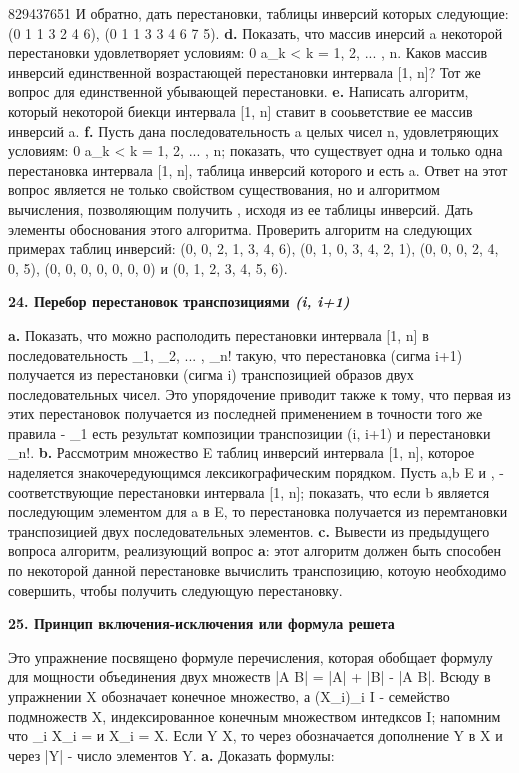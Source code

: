 ﻿
829437651\rgroup 
И обратно, дать перестановки, таблицы инверсий которых следующие:
(0 1 1 3 2 4 6), (0 1 1 3 3 4 6 7 5).
\textbf{d.} Показать, что массив инерсий a некоторой перестановки \sigma  удовлетворяет условиям: 0 \leqslant a_{k} <  k = 1, 2, ... , n. Каков массив инверсий единственной возрастающей перестановки интервала [1, n]? Тот же вопрос для единственной убывающей перестановки.
\textbf{e.} Написать алгоритм, который некоторой биекци \alpha интервала [1, n] ставит в сооьветствие ее массив инверсий a.
\textbf{f.} Пусть дана последовательность a целых чисел n, удовлетряющих условиям: 0 \leqslant a_{k} <  k = 1, 2, ... , n; показать, что существует одна и только одна перестановка \sigma интервала [1, n], таблица инверсий которого и есть a. Ответ на этот вопрос является не только свойством существования, но и алгоритмом вычисления, позволяющим получить \alpha, исходя из ее таблицы инверсий. Дать элементы обоснования этого алгоритма.
Проверить алгоритм на следующих примерах таблиц инверсий:
(0, 0, 2, 1, 3, 4, 6), (0, 1, 0, 3, 4, 2, 1), (0, 0, 0, 2, 4, 0, 5),
(0, 0, 0, 0, 0, 0, 0) и (0, 1, 2, 3, 4, 5, 6).

\textbf{24. Перебор перестановок транспозициями \textit{(i, i+1)}}

\textbf{a.} Показать, что можно располодить перестановки интервала [1, n] в последовательность \sigma_{1}, \sigma_{2}, ... , \sigma_{n!} такую, что перестановка (сигма i+1) получается из перестановки (сигма i) транспозицией образов двух последовательных чисел. Это упорядочение приводит также к тому, что первая из этих перестановок получается из последней применением в точности того же правила - \sigma_{1} есть результат композиции транспозиции (i, i+1) и перестановки \sigma_{n!}.
\textbf{b.} Рассмотрим множество E таблиц инверсий интервала [1, n], которое наделяется знакочередующимся лексикографическим порядком. Пусть a,b \in E и \alpha, \beta - соответствующие перестановки интервала [1, n]; показать, что если b является последующим элементом для a в E, то перестановка \beta получается из перемтановки \alpha транспозицией двух последовательных элементов.
\textbf{c.} Вывести из предыдущего вопроса алгоритм, реализующий вопрос \textbf{a}: этот алгоритм должен быть способен по некоторой данной перестановке вычислить транспозицию, котоую необходимо совершить, чтобы получить следующую перестановку.

\textbf{25. Принцип включения-исключения или формула решета}

Это упражнение посвящено формуле перечисления, которая обобщает формулу для мощности объединения двух множеств |A \bigcup B| = |A| + |B| - |A \cap B|. Всюду в упражнении X обозначает конечное множество, а (X_{i})_{i \in I} - семейство подмножеств X, индексированное конечным множеством интедксов I; напомним что \bigcup _{i \in \varnothing} X_{i} = \varnothing и X_{i} = X. Если Y \subset X, то через  обозначается дополнение Y в X и через |Y| - число элементов Y.
\textbf{a.} Доказать формулы:

